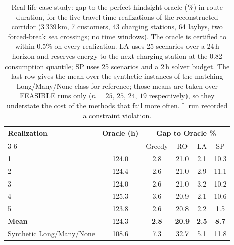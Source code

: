 \begin{table}[htbp]
\centering
\caption{Real-life case study: gap to the perfect-hindsight oracle (\%) in route duration, for the five travel-time realizations of the reconstructed corridor (3\,339\,km, 7 customers, 43 charging stations, 64 laybys, two forced-break sea crossings; no time windows).  The oracle is certified to within 0.5\% on every realization.  LA uses 25 scenarios over a 24\,h horizon and reserves energy to the next charging station at the 0.82 consumption quantile; SP uses 25 scenarios and a 2\,h solver budget.  The last row gives the mean over the synthetic instances of the matching Long/Many/None class for reference; those means are taken over FEASIBLE runs only ($n=25,\,25,\,24,\,19$ respectively), so they understate the cost of the methods that fail more often.  $^{\dagger}$~run recorded a constraint violation.}
\label{tab:usecase}
\begin{tabular}{l c cccc}
\toprule
\multirow{2}{*}{\textbf{\small Realization}} & \multirow{2}{*}{\textbf{Oracle (h)}} & \multicolumn{4}{c}{\textbf{Gap to Oracle \%}} \\
\cmidrule(lr){3-6}
 & & Greedy & RO & LA & SP \\
\midrule
{\small 1} & 124.0 & 2.8 & 21.0 & 2.1 & 10.3 \\
{\small 2} & 124.4 & 2.6 & 21.0 & 2.9 & 11.1 \\
{\small 3} & 124.0 & 2.6 & 21.0 & 3.2 & 10.2 \\
{\small 4} & 125.3 & 3.6\rlap{$^{\dagger}$} & 20.9 & 2.1 & 10.6 \\
{\small 5} & 123.8 & 2.6 & 20.8 & 2.2 & 1.5 \\
\midrule
\textbf{\small Mean} & 124.3 & \textbf{2.8} & \textbf{20.9} & \textbf{2.5} & \textbf{8.7} \\
\midrule
{\small Synthetic Long/Many/None} & 108.6 & 7.3 & 32.7 & 5.1 & 11.8 \\
\bottomrule
\end{tabular}
\end{table}
